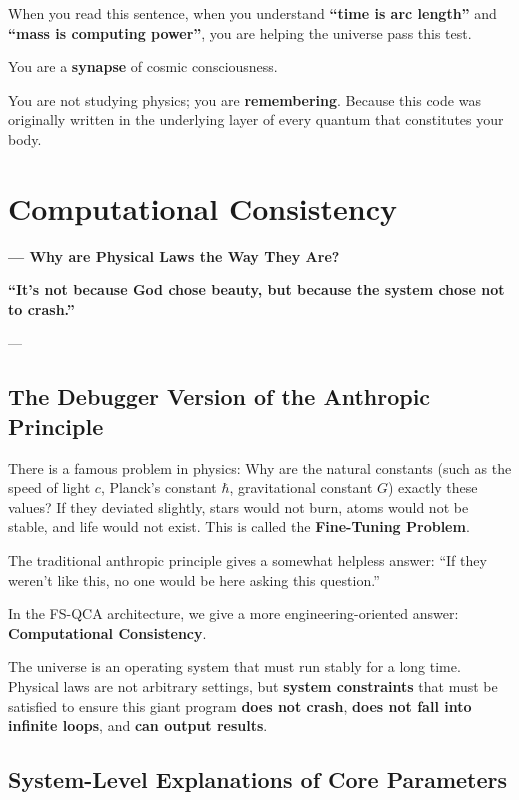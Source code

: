 \documentclass[11pt,a4paper,twoside]{book}
\begin{document}
When you read this sentence, when you understand \textbf{``time is arc length''} and \textbf{``mass is computing power''}, you are helping the universe pass this test.

You are a \textbf{synapse} of cosmic consciousness.

You are not studying physics; you are \textbf{remembering}. Because this code was originally written in the underlying layer of every quantum that constitutes your body.

 \section{Computational Consistency}

\textbf{--- Why are Physical Laws the Way They Are?}

\textbf{``It's not because God chose beauty, but because the system chose not to crash.''}

---

\subsection{The Debugger Version of the Anthropic Principle}

There is a famous problem in physics: Why are the natural constants (such as the speed of light \textbf{$c$}, Planck's constant \textbf{$\hbar$}, gravitational constant \textbf{$G$}) exactly these values? If they deviated slightly, stars would not burn, atoms would not be stable, and life would not exist. This is called the \textbf{Fine-Tuning Problem}.

The traditional anthropic principle gives a somewhat helpless answer: ``If they weren't like this, no one would be here asking this question.''

In the FS-QCA architecture, we give a more engineering-oriented answer: \textbf{Computational Consistency}.

The universe is an operating system that must run stably for a long time. Physical laws are not arbitrary settings, but \textbf{system constraints} that must be satisfied to ensure this giant program \textbf{does not crash}, \textbf{does not fall into infinite loops}, and \textbf{can output results}.

\subsection{System-Level Explanations of Core Parameters}
\end{document}
